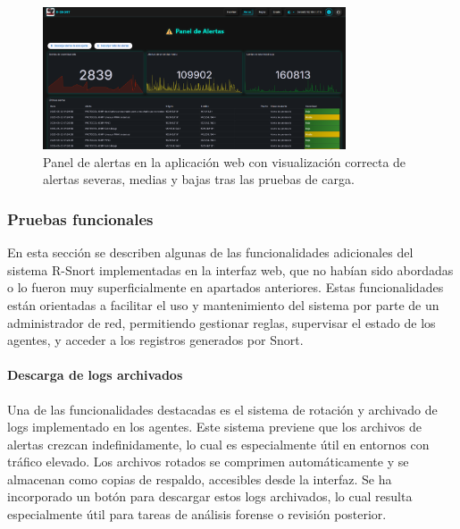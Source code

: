 \documentclass[11pt,a4paper,twoside]{report}
\begin{document}
\begin{figure}[H]
	\centering
	\includegraphics[width=0.8\textwidth]{pruebas/2.png}
	\caption{Panel de alertas en la aplicación web con visualización correcta de alertas severas, medias y bajas tras las pruebas de carga.}
	\label{fig:alertas_masivas_webapp}
\end{figure}

\subsubsection{Pruebas funcionales}
\label{sec:pruebas_funcionales}

En esta sección se describen algunas de las funcionalidades adicionales del sistema R-Snort implementadas en la interfaz web, que no habían sido abordadas o lo fueron muy superficialmente en apartados anteriores. Estas funcionalidades están orientadas a facilitar el uso y mantenimiento del sistema por parte de un administrador de red, permitiendo gestionar reglas, supervisar el estado de los agentes, y acceder a los registros generados por Snort.

\paragraph{Descarga de logs archivados}

Una de las funcionalidades destacadas es el sistema de rotación y archivado de logs implementado en los agentes. Este sistema previene que los archivos de alertas crezcan indefinidamente, lo cual es especialmente útil en entornos con tráfico elevado. Los archivos rotados se comprimen automáticamente y se almacenan como copias de respaldo, accesibles desde la interfaz. Se ha incorporado un botón para descargar estos logs archivados, lo cual resulta especialmente útil para tareas de análisis forense o revisión posterior.
\end{document}
